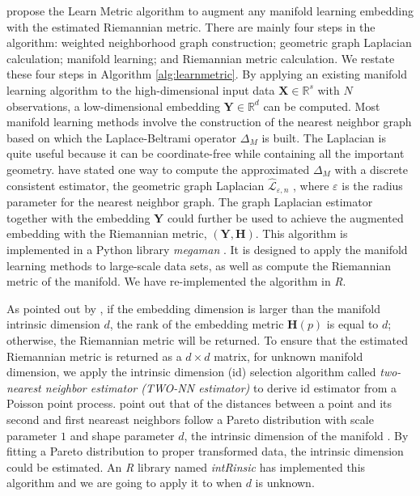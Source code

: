 \documentclass[11pt,a4paper,]{article}
\begin{document}
\textcite{Perrault-Joncas2013-pq} propose the Learn Metric algorithm to augment any manifold learning embedding with the estimated Riemannian metric. There are mainly four steps in the algorithm: weighted neighborhood graph construction; geometric graph Laplacian calculation; manifold learning; and Riemannian metric calculation. We restate these four steps in Algorithm \ref{alg:learnmetric}.
By applying an existing manifold learning algorithm to the high-dimensional input data \(\pmb{X}\in \mathbb{R}^s\) with \(N\) observations, a low-dimensional embedding \(\pmb{Y} \in \mathbb{R}^d\) can be computed. Most manifold learning methods involve the construction of the nearest neighbor graph based on which the Laplace-Beltrami operator \(\Delta_M\) is built. The Laplacian is quite useful because it can be coordinate-free while containing all the important geometry.
\textcite{Perrault-Joncas2013-pq} have stated one way to compute the approximated \(\Delta_M\) with a discrete consistent estimator, the geometric graph Laplacian \(\hat{\mathcal{L}}_{\varepsilon,n}\) \autocite{Zhou2011-za}, where \(\varepsilon\) is the radius parameter for the nearest neighbor graph.
The graph Laplacian estimator together with the embedding \(\pmb{Y}\) could further be used to achieve the augmented embedding with the Riemannian metric, \((\pmb{Y}, \pmb{H})\).
This algorithm is implemented in a Python library \emph{megaman} \autocite{McQueen2016-xz}. It is designed to apply the manifold learning methods to large-scale data sets, as well as compute the Riemannian metric of the manifold. We have re-implemented the algorithm in \emph{R}.

As pointed out by \textcite{Perrault-Joncas2013-pq}, if the embedding dimension is larger than the manifold intrinsic dimension \(d\), the rank of the embedding metric \(\pmb{H}(p)\) is equal to \(d\); otherwise, the Riemannian metric will be returned.
To ensure that the estimated Riemannian metric is returned as a \(d\times d\) matrix, for unknown manifold dimension, we apply the intrinsic dimension (id) selection algorithm called \emph{two-nearest neighbor estimator (TWO-NN estimator)} \autocite{Facco2017-rl,Denti2021-jl} to derive id estimator from a Poisson point process. \textcite{Facco2017-rl} point out that of the distances between a point and its second and first neareast neighbors follow a Pareto distribution with scale parameter \(1\) and shape parameter \(d\), the intrinsic dimension of the manifold \autocite{Facco2017-rl}. By fitting a Pareto distribution to proper transformed data, the intrinsic dimension could be estimated. An \emph{R} library named \emph{intRinsic} has implemented this algorithm and we are going to apply it to when \(d\) is unknown.
\end{document}
